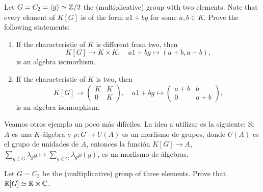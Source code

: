 \begin{exercise}
	Let $G=C_2=\langle g\rangle\simeq\mathbb{Z}/2$ the (multiplicative) 
	group with two elements. Note that every element of $K[G]$ is of the form
	$a1+bg$ for some $a,b\in K$. Prove the following statements:
	\begin{enumerate}
	    \item If the characteristic of $K$ is different from two, then 
	    \[
		K[G]\to K\times K,
		\quad
		a1+bg\mapsto (a+b,a-b),
	\]
	is an algebra isomorhism. 
	\item If the characteristic of $K$ is two, then 
	\[
	K[G]\to \begin{pmatrix}
			K & K\\
			0 & K
		\end{pmatrix},
		\quad
		a1+bg\mapsto\begin{pmatrix}
			a+b & b\\
			0 & a+b
		\end{pmatrix},
	\]
	is an algebra isomorphism. 
	\end{enumerate}
\end{exercise}

Veamos otros ejemplo un poco más difíciles. La idea a utilizar es la siguiente:
Si $A$ es una $K$-álgebra y $\rho\colon G\to U(A)$ es un morfismo de grupos,
donde $U(A)$ es el grupo de unidades de $A$, entonces la función $K[G]\to A$,
$\sum_{g\in G}\lambda_gg\mapsto\sum_{g\in G}\lambda_g\rho(g)$, es un morfismo
de álgebras.

\begin{exercise}
	Let $G=C_3$ be the (multiplicative) group of three elements. Prove that
	$\mathbb{R}[G]\simeq\mathbb{R}\times\mathbb{C}$.
\end{exercise}

